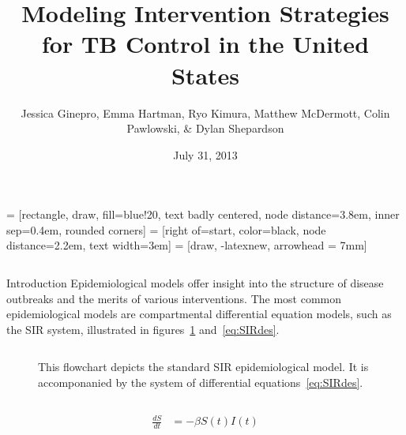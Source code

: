 \documentclass[final]{beamer}
\title{\huge Modeling Intervention Strategies for TB Control in the United States}
\author{Jessica Ginepro, Emma Hartman, Ryo Kimura, Matthew McDermott, Colin
        Pawlowski, \& Dylan Shepardson}
\institute[MHC]{Mathematical Modeling Group, Mount Holyoke College, South
                Hadley, MA, USA}
\date[July 31, 2013]{July 31, 2013}
\begin{document}
 = [rectangle, draw, fill=blue!20, text badly centered,
  node distance=3.8em, inner sep=0.4em, rounded corners]
 = [right of=start, color=black, node distance=2.2em,
text width=3em]
 = [draw, -latexnew, arrowhead = 7mm]


\begin{frame}
  \begin{columns}
    \begin{column}{.3\textwidth}
      \vspace{-25em}
      \begin{block}{Introduction}
        Epidemiological models offer insight into the structure of disease
        outbreaks and the merits of various interventions. The most common
        epidemiological models are compartmental differential equation models,
        such as the SIR system, illustrated in figures~\ref{fig:SIRFlowchart}
        and~\ref{eq:SIRdes}. 
        \begin{block}{}
          \begin{column}{.39\textwidth}
            \begin{figure}[h]
              \begin{center}
              \end{center}
              \caption{This flowchart depicts the standard SIR epidemiological
                       model. It is accomponanied by the system of differential
                       equations~\ref{eq:SIRdes}.}
              \label{fig:SIRFlowchart}
            \end{figure}
          \end{column}
          \begin{column}{.39\textwidth}
            \begin{figure}[h]
              \begin{align*}
                \frac{dS}{dt} &= -\beta S(t)I(t) \\

\end{align*}
\end{figure}
\end{column}
\end{block}
\end{block}
\end{column}
\end{columns}
\end{frame}
\end{document}
